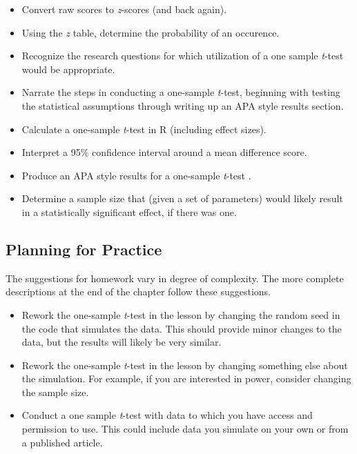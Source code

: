 \documentclass[
  11pt,
]{book}
\providecommand{\tightlist}{%
  \setlength{\itemsep}{0pt}\setlength{\parskip}{0pt}}
\begin{document}
\begin{itemize}
\tightlist
\item
  Convert raw scores to \emph{z}-scores (and back again).
\item
  Using the \emph{z} table, determine the probability of an occurence.
\item
  Recognize the research questions for which utilization of a one sample \emph{t}-test would be appropriate.
\item
  Narrate the steps in conducting a one-sample \emph{t}-test, beginning with testing the statistical assumptions through writing up an APA style results section.
\item
  Calculate a one-sample \emph{t}-test in R (including effect sizes).
\item
  Interpret a 95\% confidence interval around a mean difference score.
\item
  Produce an APA style results for a one-sample \emph{t}-test .
\item
  Determine a sample size that (given a set of parameters) would likely result in a statistically significant effect, if there was one.
\end{itemize}

\hypertarget{planning-for-practice-1}{%
\subsection{Planning for Practice}\label{planning-for-practice-1}}

The suggestions for homework vary in degree of complexity. The more complete descriptions at the end of the chapter follow these suggestions.

\begin{itemize}
\tightlist
\item
  Rework the one-sample \emph{t}-test in the lesson by changing the random seed in the code that simulates the data. This should provide minor changes to the data, but the results will likely be very similar.
\item
  Rework the one-sample \emph{t}-test in the lesson by changing something else about the simulation. For example, if you are interested in power, consider changing the sample size.
\item
  Conduct a one sample \emph{t}-test with data to which you have access and permission to use. This could include data you simulate on your own or from a published article.
\end{itemize}
\end{document}
